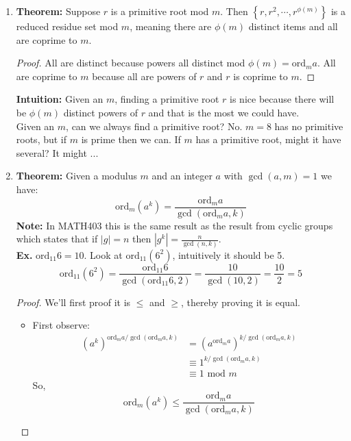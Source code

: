 \documentclass[class=article, crop=false]{standalone}
\begin{document}
\begin{enumerate}
\begin{enumerate}
	\item \textbf{Theorem:} Suppose $r$ is a primitive root mod $m$. Then $\left\{r, r^2, \cdots, r^{\phi(m)} \right\}$
	is a reduced residue set mod $m$, meaning there are $\phi(m)$ distinct items and all are coprime to $m$.
	\begin{proof}
		All are distinct because powers all distinct mod $\phi(m)=\mbox{ord}_m a$.
		All are coprime to $m$ because all are powers of $r$ and $r$ is coprime to $m$.
	\end{proof}
	\noindent\textbf{Intuition:} Given an $m$, finding a primitive root $r$ is nice because there
	will be $\phi(m)$ distinct powers of $r$ and that is the most we could have. \\
	Given an $m$, can we always find a primitive root?
	No. $m=8$ has no primitive roots, but if $m$ is prime then we can.
	If $m$ has a primitive root, might it have several? It might ...

	\item \textbf{Theorem:} Given a modulus $m$ and an integer $a$ with $\gcd(a,m)=1$ we have:
	$$\mbox{ord}_m \left(a^k\right) = \frac{\mbox{ord}_m a}{\gcd(\mbox{ord}_m a, k)}$$
	\textbf{Note:} In MATH403 this is the same result as the result from cyclic groups
	which states that if $|g|=n$ then $\left| g^k\right| = \frac{n}{\gcd(n,k)}$. \\
	\textbf{Ex.} $\mbox{ord}_{11} 6 = 10$. Look at $\mbox{ord}_{11} (6^2)$, intuitively it should be 5.
	$$\mbox{ord}_{11} (6^2) = \frac{\mbox{ord}_{11} 6}{\gcd(\mbox{ord}_{11} 6, 2)} = \frac{10}{\gcd(10, 2)} = \frac{10}{2} = 5$$
	\begin{proof}
		We'll first proof it is $\leq$ and $\geq$, thereby proving it is equal.
		\begin{itemize}
			\item First observe:
			\begin{align*}
				\left(a^k\right)^{\mbox{ord}_m a / \gcd(\mbox{ord}_m a, k)} &= \left(a^{\mbox{ord}_m a}\right)^{k / \gcd(\mbox{ord}_m a, k)} \\
				&\equiv 1 ^{k / \gcd(\mbox{ord}_m a, k)} \\
				&\equiv 1\mbox{ mod }m
			\end{align*}
			So, $$\mbox{ord}_m (a^k) \leq \frac{\mbox{ord}_m a}{\gcd(\mbox{ord}_m a, k)}$$


\end{itemize}
\end{proof}
\end{enumerate}
\end{enumerate}
\end{document}
